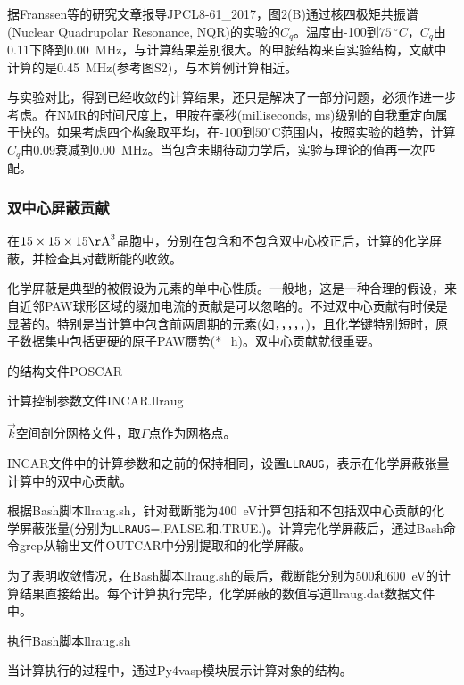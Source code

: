 据\textrm{Franssen}等的研究文章报导\textrm{JPCL8-61_2017}，图\textrm{2(B)}通过核四极矩共振谱\textrm{(Nuclear Quadrupolar Resonance, NQR)}的实验的$C_q$。温度由-100到$75~^{\circ}C$，$C_q$由0.11下降到\textrm{0.00~MHz}，与计算结果差别很大。的甲胺结构来自实验结构，文献中计算的是\textrm{0.45~MHz}(参考图\textrm{S2})，与本算例计算相近。

与实验对比，得到已经收敛的计算结果，还只是解决了一部分问题，必须作进一步考虑。在\textrm{NMR}的时间尺度上，甲胺在毫秒\textrm{(milliseconds, ms)}级别的自我重定向属于快的。如果考虑四个构象取平均，在-100到$50^{\circ}\mathrm{C}$范围内，按照实验的趋势，计算$C_q$由0.09衰减到\textrm{0.00~MHz}。当包含未期待动力学后，实验与理论的值再一次匹配。

\subsubsection{双中心屏蔽贡献}
在$15\times15\times15\mathrm{\AA}^3$晶胞中，分别在包含和不包含双中心校正后，计算的化学屏蔽，并检查其对截断能的收敛。

化学屏蔽是典型的被假设为元素的单中心性质。一般地，这是一种合理的假设，来自近邻\textrm{PAW}球形区域的缀加电流的贡献是可以忽略的。不过双中心贡献有时候是显著的。特别是当计算中包含前两周期的元素(如，，，，，)，且化学键特别短时，原子数据集中包括更硬的原子\textrm{PAW}赝势\textrm{(*\_h)}。双中心贡献就很重要。

的结构文件\textrm{POSCAR}

计算控制参数文件\textrm{INCAR.llraug}

$\vec k$空间剖分网格文件，取$\Gamma$点作为网格点。

\textrm{INCAR}文件中的计算参数和之前的保持相同，设置\texttt{LLRAUG}，表示在化学屏蔽张量计算中的双中心贡献。

根据\textrm{Bash}脚本\textrm{llraug.sh}，针对截断能为\textrm{400~eV}计算包括和不包括双中心贡献的化学屏蔽张量(分别为\texttt{LLRAUG}=\textrm{.FALSE.}和\textrm{.TRUE.})。计算完化学屏蔽后，通过\textrm{Bash}命令\textrm{grep}从输出文件\textrm{OUTCAR}中分别提取和的化学屏蔽。

为了表明收敛情况，在\textrm{Bash}脚本\textrm{llraug.sh}的最后，截断能分别为500和\textrm{600~eV}的计算结果直接给出。每个计算执行完毕，化学屏蔽的数值写道\textrm{llraug.dat}数据文件中。

执行\textrm{Bash}脚本\textrm{llraug.sh}

当计算执行的过程中，通过\textrm{Py4vasp}模块展示计算对象的结构。

